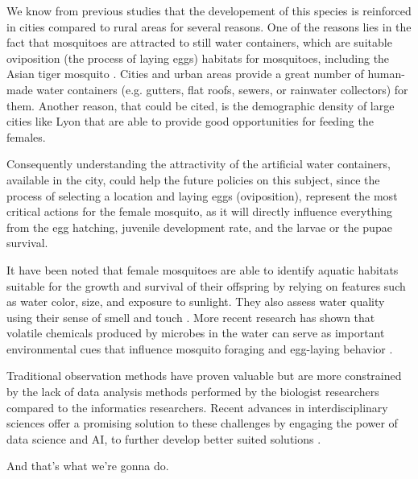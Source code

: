 We know from previous studies that the developement of this species is reinforced in cities compared to rural areas for several reasons.
One of the reasons lies in the fact that mosquitoes are attracted to still water containers, which are suitable oviposition (the process of laying eggs) habitats for mosquitoes, including the Asian tiger mosquito \cite{duval2022how}. Cities and urban areas provide a great number of human-made water containers (e.g. gutters, flat roofs, sewers, or rainwater collectors) for them.
Another reason, that could be cited, is the demographic density of large cities like Lyon that are able to provide good opportunities for feeding the females.

Consequently understanding the attractivity of the artificial water containers, available in the city, could help the future policies on this subject, since the process of selecting a location and laying eggs (oviposition), represent the most critical actions for the female mosquito, as it will directly influence everything from the egg hatching, juvenile development rate, and the larvae or the pupae survival. 

It have been noted that female mosquitoes are able to identify aquatic habitats suitable for the growth and survival of their offspring by relying on features such as water color, size, and exposure to sunlight. They also assess water quality using their sense of smell and touch \cite{insects7040065}. More recent research has shown that volatile chemicals produced by microbes in the water can serve as important environmental cues that influence mosquito foraging and egg-laying behavior \cite{microorganisms9081589}.

Traditional observation methods have proven valuable but are more constrained by the lack of data analysis methods performed by the biologist researchers compared to the informatics researchers. Recent advances in interdisciplinary sciences offer a promising solution to these challenges by engaging the power of data science and AI, to further develop better suited solutions \cite{}.

And that's what we're gonna do.


